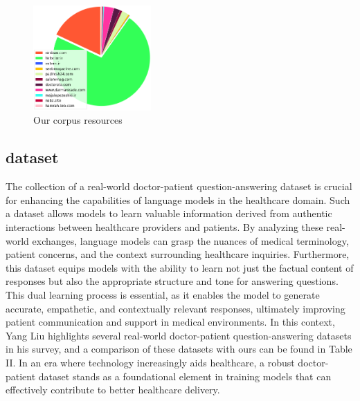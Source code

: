 \documentclass[conference]{IEEEtran}
\begin{document}
\begin{figure}[htbp]
	\centerline{\includegraphics[width=0.4\textwidth]{fig1.png}}
	\caption{Our corpus resources}
	\label{fig1}
\end{figure}

\subsection{dataset}
The collection of a real-world doctor-patient question-answering dataset is crucial for enhancing the capabilities of language models in the healthcare domain. Such a dataset allows models to learn valuable information derived from authentic interactions between healthcare providers and patients. By analyzing these real-world exchanges, language models can grasp the nuances of medical terminology, patient concerns, and the context surrounding healthcare inquiries. Furthermore, this dataset equips models with the ability to learn not just the factual content of responses but also the appropriate structure and tone for answering questions. This dual learning process is essential, as it enables the model to generate accurate, empathetic, and contextually relevant responses, ultimately improving patient communication and support in medical environments. In this context, Yang Liu \cite{b6} highlights several real-world doctor-patient question-answering datasets in his survey, and a comparison of these datasets with ours can be found in Table II. In an era where technology increasingly aids healthcare, a robust doctor-patient dataset stands as a foundational element in training models that can effectively contribute to better healthcare delivery.
\end{document}
